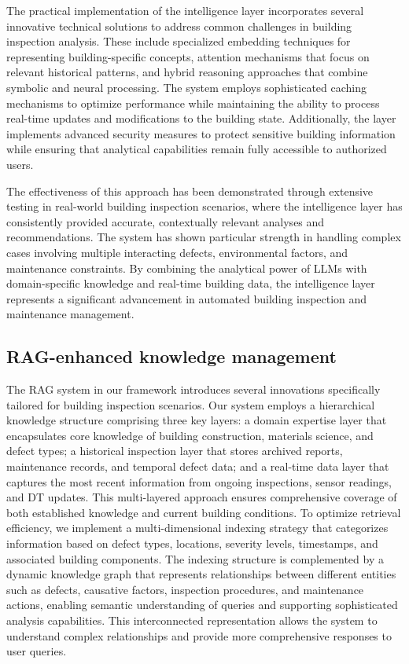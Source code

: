 \documentclass[a4paper,fleqn]{cas-sc}
\begin{document}
The practical implementation of the intelligence layer incorporates several innovative technical solutions to address common challenges in building inspection analysis. These include specialized embedding techniques for representing building-specific concepts, attention mechanisms that focus on relevant historical patterns, and hybrid reasoning approaches that combine symbolic and neural processing. The system employs sophisticated caching mechanisms to optimize performance while maintaining the ability to process real-time updates and modifications to the building state. Additionally, the layer implements advanced security measures to protect sensitive building information while ensuring that analytical capabilities remain fully accessible to authorized users.

The effectiveness of this approach has been demonstrated through extensive testing in real-world building inspection scenarios, where the intelligence layer has consistently provided accurate, contextually relevant analyses and recommendations. The system has shown particular strength in handling complex cases involving multiple interacting defects, environmental factors, and maintenance constraints. By combining the analytical power of LLMs with domain-specific knowledge and real-time building data, the intelligence layer represents a significant advancement in automated building inspection and maintenance management.


\subsection{RAG-enhanced knowledge management}

The RAG system in our framework introduces several innovations specifically tailored for building inspection scenarios. Our system employs a hierarchical knowledge structure comprising three key layers: a domain expertise layer that encapsulates core knowledge of building construction, materials science, and defect types; a historical inspection layer that stores archived reports, maintenance records, and temporal defect data; and a real-time data layer that captures the most recent information from ongoing inspections, sensor readings, and DT updates. This multi-layered approach ensures comprehensive coverage of both established knowledge and current building conditions. To optimize retrieval efficiency, we implement a multi-dimensional indexing strategy that categorizes information based on defect types, locations, severity levels, timestamps, and associated building components. The indexing structure is complemented by a dynamic knowledge graph that represents relationships between different entities such as defects, causative factors, inspection procedures, and maintenance actions, enabling semantic understanding of queries and supporting sophisticated analysis capabilities. This interconnected representation allows the system to understand complex relationships and provide more comprehensive responses to user queries.
\end{document}
